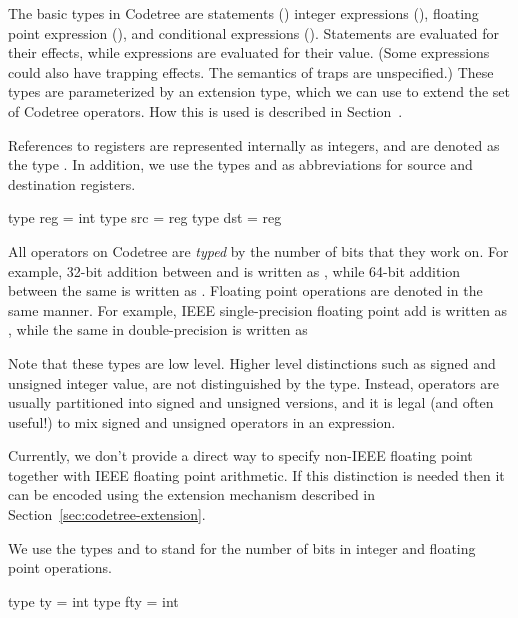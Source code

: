   The basic types in Codetree are statements ()
integer expressions (), 
floating point expression (), 
and conditional expressions (). 
Statements are evaluated for their effects,
while expressions are evaluated for their value. (Some expressions
could also have trapping effects.  The semantics of traps are unspecified.)
These types are parameterized by an extension
type, which we can use to extend the set of Codetree 
operators.  How this is used is described in Section~.

References to registers are represented internally as integers, and are denoted
as the type . In addition, we use the types  and 
as abbreviations for source and destination registers.
\begin{SML}
   type reg = int
   type src = reg
   type dst = reg
\end{SML}

All operators on Codetree are \emph{typed}
by the number of bits that 
they work on.  For example, 32-bit addition between  and 
is written as , while 64-bit addition between the same
is written as .  Floating point operations are
denoted in the same manner.  For example, IEEE single-precision floating
point add is written as , while the same in
double-precision is written as  

Note that these types are low level.  Higher level distinctions such
as signed and unsigned integer value, are not distinguished by the type.  
Instead, operators are usually partitioned into signed and unsigned versions, 
and it is legal (and often useful!) to mix signed and unsigned operators in
an expression.

Currently, we don't provide a direct way to specify non-IEEE floating point 
together with
IEEE floating point arithmetic.  If this distinction is needed then
it can be encoded using the extension mechanism described
in Section~\ref{sec:codetree-extension}.

We use the types  and  to stand for the number of
bits in integer and floating point operations.  
\begin{SML}
  type ty  = int
  type fty = int
\end{SML}

